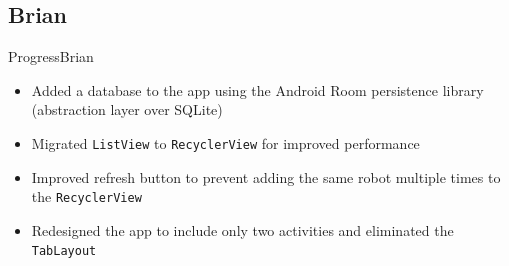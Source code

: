 \documentclass{beamer}
\begin{document}
\subsection{Brian}
\begin{frame}{Progress}{Brian}
    \begin{itemize}
        \item Added a database to the app using the Android Room persistence library (abstraction layer over SQLite)
        \item Migrated \texttt{ListView} to \texttt{RecyclerView} for improved performance
        \item Improved refresh button to prevent adding the same robot multiple times to the \texttt{RecyclerView}  
        \item Redesigned the app to include only two activities and eliminated the \texttt{TabLayout}
    \end{itemize}
\end{frame}
\end{document}
